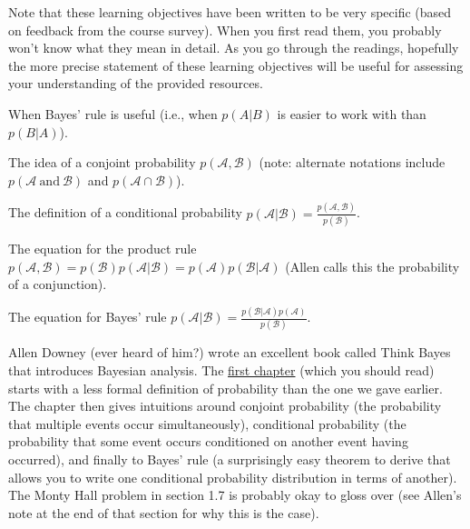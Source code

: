 \documentclass[assignment01_Solutions]{subfiles}
\begin{document}
\begin{externalresources}[(60 minutes)]
\begin{learningobjectives}
Note that these learning objectives have been written to be very specific (based on feedback from the course survey).  When you first read them, you probably won't know what they mean in detail.  As you go through the readings, hopefully the more precise statement of these learning objectives will be useful for assessing your understanding of the provided resources.

\bi
\item When Bayes' rule is useful (i.e., when $p(A|B)$ is easier to work with than $p(B|A)$).
\item The idea of a conjoint probability $p(\mathcal{A}, \mathcal{B})$ (note: alternate notations include $p(\mathcal{A}~\mbox{and}~\mathcal{B})$ and $p(\mathcal{A} \cap \mathcal{B})$).
\item The definition of a conditional probability $p(\mathcal{A} | \mathcal{B}) = \frac{p(\mathcal{A},\mathcal{B})}{p(\mathcal{B})}$.
\item The equation for the product rule $p(\mathcal{A}, \mathcal{B}) = p(\mathcal{B}) p(\mathcal{A} | \mathcal{B}) =  p(\mathcal{A}) p(\mathcal{B} | \mathcal{A})$ (Allen calls this the probability of a conjunction).
\item The equation for Bayes' rule $p(\mathcal{A} | \mathcal{B}) = \frac{p(\mathcal{B} | \mathcal{A}) p(\mathcal{A})}{p(\mathcal{B})}$.
\ei
\end{learningobjectives}

Allen Downey (ever heard of him?) wrote an excellent book called Think Bayes that introduces Bayesian analysis.  The \href{http://www.greenteapress.com/thinkbayes/html/thinkbayes002.html}{first chapter} (which you should read) starts with a less formal definition of probability than the one we gave earlier.  The chapter then gives intuitions around conjoint probability (the probability that multiple events occur simultaneously), conditional probability (the probability that some event occurs conditioned on another event having occurred), and finally to Bayes' rule (a surprisingly easy theorem to derive that allows you to write one conditional probability distribution in terms of another).  The Monty Hall problem in section 1.7 is probably okay to gloss over (see Allen's note at the end of that section for why this is the case).


\end{externalresources}
\end{document}

